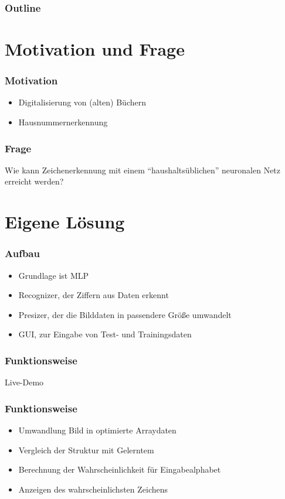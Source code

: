 \documentclass[14pt]{beamer}
\institute{Universit\"at Hamburg\\\trinstitute}
\title{\trtitle}
\subtitle{\trtype}
\author{\trauthor}
\date{}
\theoremstyle{remark}
\begin{document}
\renewcommand{\arraystretch}{1.2}

\begin{frame}[plain] %
  \titlepage
\end{frame}

\begin{frame}
	\frametitle{Outline}
	\tableofcontents
\end{frame}


\section{Motivation und Frage}
\begin{frame}
	\frametitle{Motivation}
	\begin{itemize}
		\item Digitalisierung von (alten) Büchern
		\item Hausnummernerkennung
	\end{itemize}
\end{frame}

\begin{frame}
	\frametitle{Frage}
	\centering
	Wie kann Zeichenerkennung mit einem "`haushaltsüblichen"' neuronalen Netz erreicht werden?
\end{frame}

\section{Eigene Lösung}
\begin{frame}
	\frametitle{Aufbau}
	\begin{itemize}
		\item Grundlage ist MLP
		\item Recognizer, der Ziffern aus Daten erkennt
		\item Presizer, der die Bilddaten in passendere Größe umwandelt
		\item GUI, zur Eingabe von Test- und Trainingsdaten
	\end{itemize}
\end{frame}

\begin{frame}
	\frametitle{Funktionsweise}
	\centering
	Live-Demo
\end{frame}

\begin{frame}
	\frametitle{Funktionsweise}
	\begin{itemize}
		\item Umwandlung Bild in optimierte Arraydaten
		\item Vergleich der Struktur mit Gelerntem
		\item Berechnung der Wahrscheinlichkeit für Eingabealphabet
		\item Anzeigen des wahrscheinlichsten Zeichens
	\end{itemize}
\end{frame}
\end{document}

